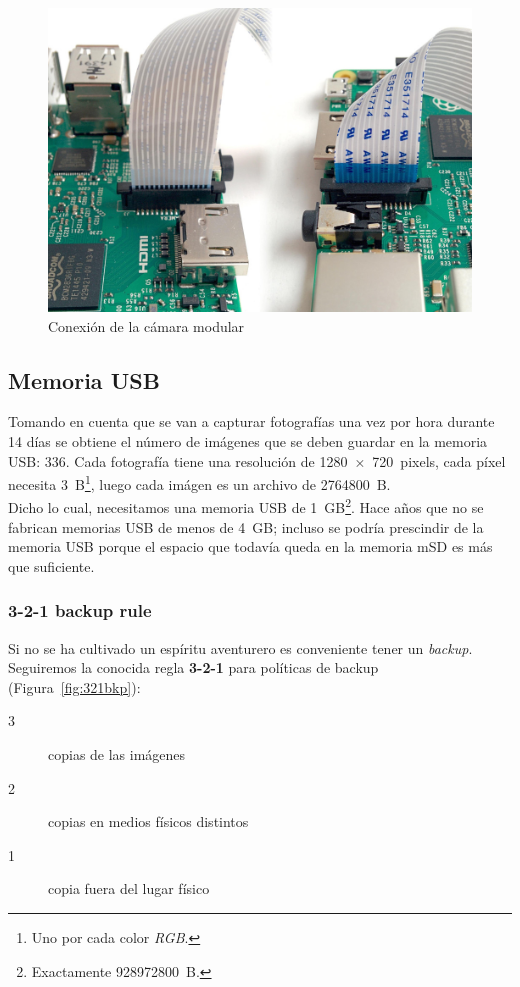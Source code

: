 \documentclass[10pt,a4paper]{article}
\begin{document}
\begin{figure}
\centering
    \includegraphics[scale=0.15]{connect-camera.jpg}
    \caption{Conexi\'on de la c\'amara modular}
    \label{fig:ribbon}
\end{figure}

\subsection{Memoria USB}

Tomando en cuenta que se van a capturar fotograf\'ias una vez por hora durante 14 d\'ias se obtiene el n\'umero de im\'agenes que se deben guardar en la memoria USB: $336$. Cada fotograf\'ia tiene una resoluci\'on de \SI{1280x720}{pixels}, cada p\'ixel necesita \SI{3}{B}\footnote{Uno por cada color \emph{RGB}.}, luego cada im\'agen es un archivo de \SI{2764800}{B}.\\

Dicho lo cual, necesitamos una memoria USB de \SI{1}{GB}\footnote{Exactamente \SI{928972800}{B}.}. Hace a\~nos que no se fabrican memorias USB de menos de \SI{4}{GB}; incluso se podr\'ia prescindir de la memoria USB porque el espacio que todav\'ia queda en la memoria mSD es m\'as que suficiente.\\

\subsubsection{3-2-1 backup rule}

Si no se ha cultivado un esp\'iritu aventurero es conveniente tener un \emph{backup}. Seguiremos la conocida regla \textbf{3-2-1} para pol\'iticas de backup (Figura~\ref{fig:321bkp}):
\begin{description}
    \item [3] copias de las im\'agenes
    \item [2] copias en medios f\'isicos distintos
    \item [1] copia fuera del lugar f\'isico
\end{description}
\end{document}
